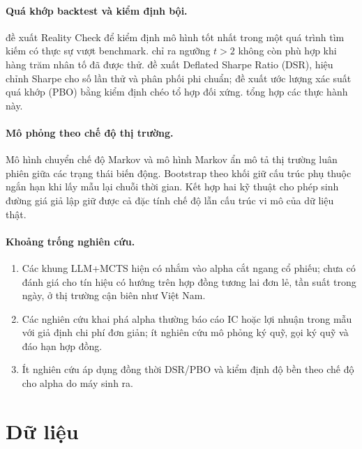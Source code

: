 \documentclass[12pt,a4paper]{article}
\begin{document}
\paragraph{Quá khớp backtest và kiểm định bội.}
\citet{white2000reality} đề xuất Reality Check để kiểm định mô hình tốt nhất trong một quá trình tìm kiếm có thực sự vượt benchmark. \citet{harvey2016cross} chỉ ra ngưỡng $t > 2$ không còn phù hợp khi hàng trăm nhân tố đã được thử. \citet{bailey2014dsr} đề xuất Deflated Sharpe Ratio (DSR), hiệu chỉnh Sharpe cho số lần thử và phân phối phi chuẩn; \citet{bailey2017pbo} đề xuất ước lượng xác suất quá khớp (PBO) bằng kiểm định chéo tổ hợp đối xứng. \citet{lopezdeprado2018afml} tổng hợp các thực hành này.

\paragraph{Mô phỏng theo chế độ thị trường.}
Mô hình chuyển chế độ Markov \citep{hamilton1989regime} và mô hình Markov ẩn \citep{rabiner1989hmm} mô tả thị trường luân phiên giữa các trạng thái biến động. Bootstrap theo khối \citep{kunsch1989block} giữ cấu trúc phụ thuộc ngắn hạn khi lấy mẫu lại chuỗi thời gian. Kết hợp hai kỹ thuật cho phép sinh đường giá giả lập giữ được cả đặc tính chế độ lẫn cấu trúc vi mô của dữ liệu thật.

\paragraph{Khoảng trống nghiên cứu.}
\begin{enumerate}
  \item Các khung LLM+MCTS hiện có nhắm vào alpha cắt ngang cổ phiếu; chưa có đánh giá cho tín hiệu có hướng trên hợp đồng tương lai đơn lẻ, tần suất trong ngày, ở thị trường cận biên như Việt Nam.
  \item Các nghiên cứu khai phá alpha thường báo cáo IC hoặc lợi nhuận trong mẫu với giả định chi phí đơn giản; ít nghiên cứu mô phỏng ký quỹ, gọi ký quỹ và đáo hạn hợp đồng.
  \item Ít nghiên cứu áp dụng đồng thời DSR/PBO và kiểm định độ bền theo chế độ cho alpha do máy sinh ra.
\end{enumerate}

\section{Dữ liệu}
\end{document}
